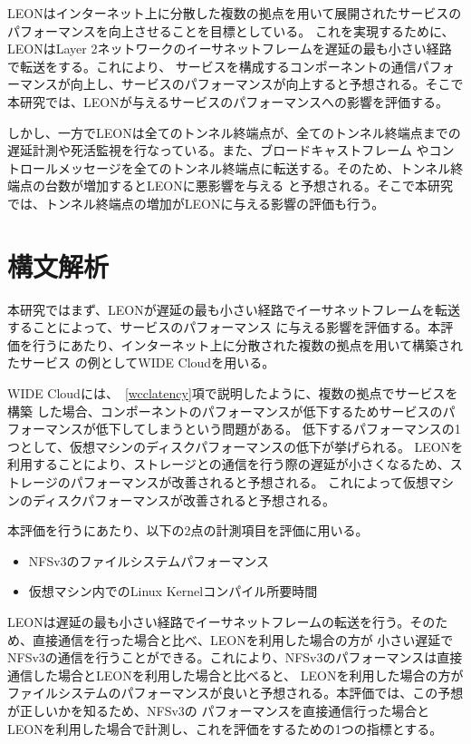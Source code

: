LEONはインターネット上に分散した複数の拠点を用いて展開されたサービスのパフォーマンスを向上させることを目標としている。
これを実現するために、LEONはLayer 2ネットワークのイーサネットフレームを遅延の最も小さい経路で転送をする。これにより、
サービスを構成するコンポーネントの通信パフォーマンスが向上し、サービスのパフォーマンスが向上すると予想される。そこで
本研究では、LEONが与えるサービスのパフォーマンスへの影響を評価する。

しかし、一方でLEONは全てのトンネル終端点が、全てのトンネル終端点までの遅延計測や死活監視を行なっている。また、ブロードキャストフレーム
やコントロールメッセージを全てのトンネル終端点に転送する。そのため、トンネル終端点の台数が増加するとLEONに悪影響を与える
と予想される。そこで本研究では、トンネル終端点の増加がLEONに与える影響の評価も行う。

\section{構文解析}

本研究ではまず、LEONが遅延の最も小さい経路でイーサネットフレームを転送することによって、サービスのパフォーマンス
に与える影響を評価する。本評価を行うにあたり、インターネット上に分散された複数の拠点を用いて構築されたサービス
の例としてWIDE Cloudを用いる。

WIDE Cloudには、~\ref{wcclatency}項で説明したように、複数の拠点でサービスを構築
した場合、コンポーネントのパフォーマンスが低下するためサービスのパフォーマンスが低下してしまうという問題がある。
低下するパフォーマンスの1つとして、仮想マシンのディスクパフォーマンスの低下が挙げられる。
LEONを利用することにより、ストレージとの通信を行う際の遅延が小さくなるため、ストレージのパフォーマンスが改善されると予想される。
これによって仮想マシンのディスクパフォーマンスが改善されると予想される。

本評価を行うにあたり、以下の2点の計測項目を評価に用いる。

\begin{itemize}
	\item{NFSv3のファイルシステムパフォーマンス}
	\item{仮想マシン内でのLinux Kernelコンパイル所要時間}
\end{itemize}

LEONは遅延の最も小さい経路でイーサネットフレームの転送を行う。そのため、直接通信を行った場合と比べ、LEONを利用した場合の方が
小さい遅延でNFSv3の通信を行うことができる。これにより、NFSv3のパフォーマンスは直接通信した場合とLEONを利用した場合と比べると、
LEONを利用した場合の方がファイルシステムのパフォーマンスが良いと予想される。本評価では、この予想が正しいかを知るため、NFSv3の
パフォーマンスを直接通信行った場合とLEONを利用した場合で計測し、これを評価をするための1つの指標とする。


